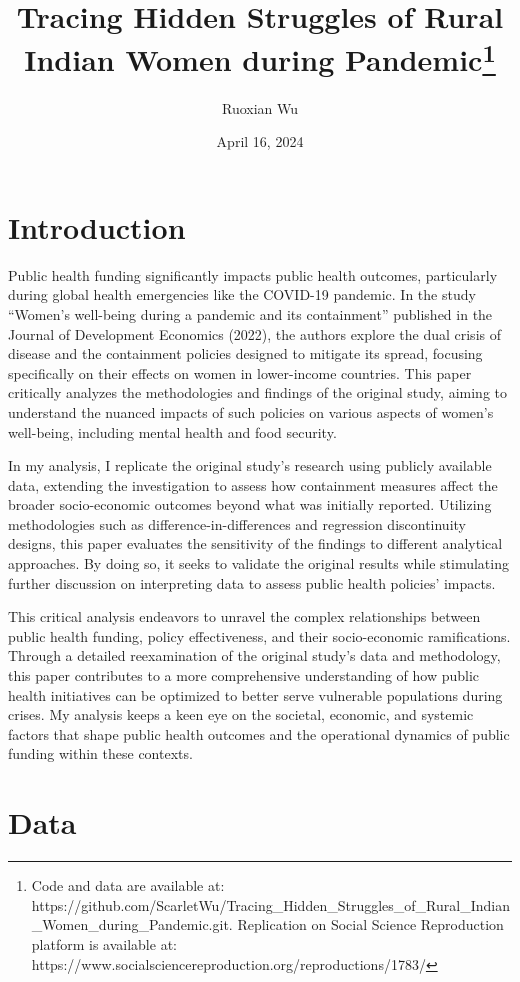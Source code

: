 \documentclass[
  letterpaper,
  DIV=11,
  numbers=noendperiod]{scrartcl}
\title{Tracing Hidden Struggles of Rural Indian Women during
Pandemic\thanks{Code and data are available at:
https://github.com/ScarletWu/Tracing\_Hidden\_Struggles\_of\_Rural\_Indian\_Women\_during\_Pandemic.git.
Replication on Social Science Reproduction platform is available at:
https://www.socialsciencereproduction.org/reproductions/1783/}}
\author{Ruoxian Wu}
\date{April 16, 2024}
\renewcommand*\contentsname{Table of contents}
\newcommand\contentsname{Table of contents}
\begin{document}
\maketitle

\renewcommand*\contentsname{Table of contents}
{
\hypersetup{linkcolor=}
\setcounter{tocdepth}{3}
\tableofcontents
}
\section{Introduction}\label{introduction}

Public health funding significantly impacts public health outcomes,
particularly during global health emergencies like the COVID-19
pandemic. In the study ``Women's well-being during a pandemic and its
containment'' published in the Journal of Development Economics (2022),
the authors explore the dual crisis of disease and the containment
policies designed to mitigate its spread, focusing specifically on their
effects on women in lower-income countries. This paper critically
analyzes the methodologies and findings of the original study, aiming to
understand the nuanced impacts of such policies on various aspects of
women's well-being, including mental health and food security.

In my analysis, I replicate the original study's research using publicly
available data, extending the investigation to assess how containment
measures affect the broader socio-economic outcomes beyond what was
initially reported. Utilizing methodologies such as
difference-in-differences and regression discontinuity designs, this
paper evaluates the sensitivity of the findings to different analytical
approaches. By doing so, it seeks to validate the original results while
stimulating further discussion on interpreting data to assess public
health policies' impacts.

This critical analysis endeavors to unravel the complex relationships
between public health funding, policy effectiveness, and their
socio-economic ramifications. Through a detailed reexamination of the
original study's data and methodology, this paper contributes to a more
comprehensive understanding of how public health initiatives can be
optimized to better serve vulnerable populations during crises. My
analysis keeps a keen eye on the societal, economic, and systemic
factors that shape public health outcomes and the operational dynamics
of public funding within these contexts.

\section{Data}\label{data}
\end{document}
